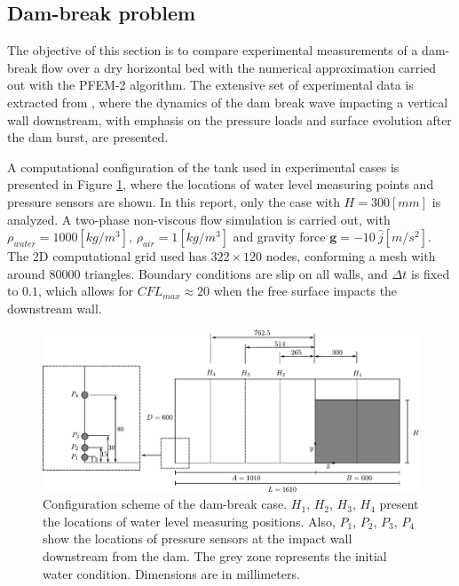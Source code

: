\subsection{Dam-break problem}\label{sec:db}

The objective of this section is to compare experimental measurements of a dam-break flow over a dry horizontal bed with the numerical approximation carried out with the PFEM-2 algorithm. The extensive set of experimental data is extracted from \cite{Lobovsky13}, where the dynamics of the dam break wave impacting a vertical wall downstream, with emphasis on the pressure loads and surface evolution after the dam burst, are presented.

A computational configuration of the tank used in experimental cases is presented in Figure \ref{fg:dambreak-config}, where the locations of water level measuring points and pressure sensors are shown. In this report, only the case with $H=300[mm]$ is analyzed. A two-phase non-viscous flow simulation is carried out, with $\rho_{water}=1000[kg/m^3]$, $\rho_{air}=1[kg/m^3]$ and gravity force $\mathbf{g}=-10\ \hat{j} [m/s^2]$. The 2D computational grid used has $322\times120$ nodes, conforming a mesh with around $80000$ triangles. Boundary conditions are slip on all walls, and $\Delta t$ is fixed to $0.1$, which allows for $CFL_{max}\approx20$ when the free surface impacts the downstream wall.

\begin{figure}[htbp]
  \begin{center}
      \includegraphics[width=\columnwidth]{images/dam_break_config.pdf}
  \end{center}
  \caption{\label{fg:dambreak-config} Configuration scheme of the dam-break case. $H_1$, $H_2$, $H_3$, $H_4$ present the locations of water level measuring positions. Also, $P_1$, $P_2$, $P_3$, $P_4$ show the locations of pressure sensors at the impact wall downstream from the dam. The grey zone represents the initial water condition. Dimensions are in millimeters.}
\end{figure}

